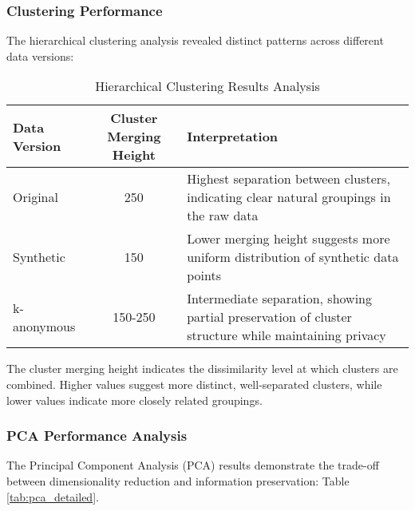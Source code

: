 \documentclass[a4paper, 11pt]{article}
\begin{document}
\subsubsection{Clustering Performance}
The hierarchical clustering analysis revealed distinct patterns across different data versions:

\begin{table}[h]
\centering
\begin{tabular}{|l|c|p{7cm}|}
\hline
\textbf{Data Version} & \textbf{Cluster Merging Height} & \textbf{Interpretation} \\
\hline
Original & 250 & Highest separation between clusters, indicating clear natural groupings in the raw data \\
Synthetic & 150 & Lower merging height suggests more uniform distribution of synthetic data points \\
k-anonymous & 150-250 & Intermediate separation, showing partial preservation of cluster structure while maintaining privacy \\
\hline
\end{tabular}
\caption{Hierarchical Clustering Results Analysis}
\label{tab:clustering_analysis}
\end{table}

The cluster merging height indicates the dissimilarity level at which clusters are combined. Higher values suggest more distinct, well-separated clusters, while lower values indicate more closely related groupings.

\subsubsection{PCA Performance Analysis}
The Principal Component Analysis (PCA) results demonstrate the trade-off between dimensionality reduction and information preservation: Table \ref{tab:pca_detailed}.
\end{document}
